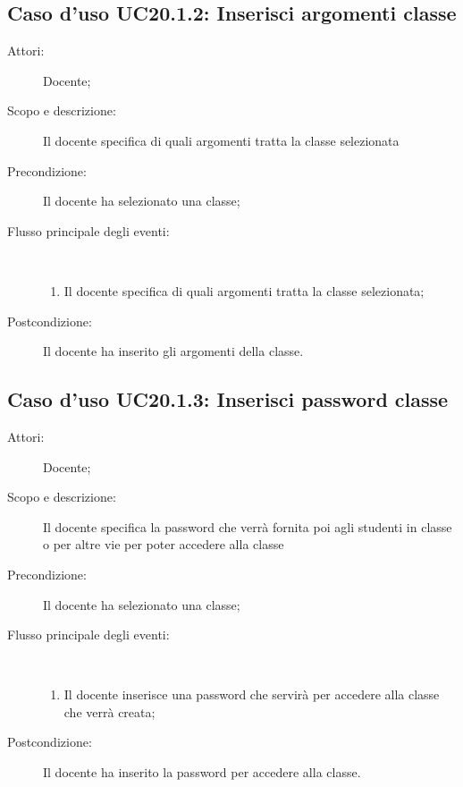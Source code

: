 \subsection{Caso d'uso UC20.1.2: Inserisci argomenti classe}\begin{description}
	\item[Attori:] Docente;
	\item[Scopo e descrizione:] Il docente specifica di quali argomenti tratta la classe selezionata
	\item[Precondizione:] Il docente ha selezionato una classe;
	
	\item[Flusso principale degli eventi:] \ 
	\begin{enumerate}
		\item Il docente specifica di quali argomenti tratta la classe selezionata;
		
	\end{enumerate}
	\item[Postcondizione:] Il docente ha inserito gli argomenti della classe.
\end{description}
\hypertarget{UC20.1.3}{}
\subsection{Caso d'uso UC20.1.3: Inserisci password classe}\begin{description}
	\item[Attori:] Docente;
	\item[Scopo e descrizione:] Il docente specifica la password che verrà fornita poi agli studenti in classe o per altre vie per poter accedere alla classe
	\item[Precondizione:] Il docente ha selezionato una classe;
	
	\item[Flusso principale degli eventi:] \ 
	\begin{enumerate}
		\item Il docente inserisce una password che servirà per accedere alla classe che verrà creata;
		
	\end{enumerate}
	\item[Postcondizione:] Il docente ha inserito la password per accedere alla classe.
\end{description}
\hypertarget{UC20.2}{}
